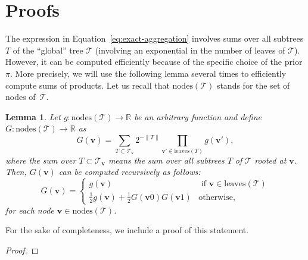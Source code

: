 \documentclass{article}
\newcommand{\R}{\mathbb R}
\newcommand{\node}{\mathbf{v}} %
\newcommand{\nodes}{\mathrm{nodes}} %
\newcommand{\leaves}{\mathrm{leaves}} %
\newcommand{\tree}{\mathcal{T}} %
\newtheorem{lemma}{Lemma}
\begin{document}



\section{Proofs}
\label{sec:proofs}

The expression in Equation~\eqref{eq:exact-aggregation} involves sums over all subtrees $T$ of the ``global'' tree $\tree$ (involving an exponential in the number of leaves of $\tree$).
However, it can be computed efficiently because of the specific choice of the prior $\pi$.
More precisely, we will use the following lemma \cite[Lemma~1]{helmbold1997pruning} several times to efficiently compute sums of products.
Let us recall that $\nodes(\tree)$ stands for the set of nodes of~$\tree$.
\begin{lemma}
  \label{lem:ctw-sum-prod}
  Let $g: \nodes(\tree) \to \R$ be an arbitrary function and define $G: \nodes(\tree) \to \R$ as
  \begin{equation}
  \label{eq:ctw-sum-prod-def}
  G (\node) = \sum_{T \subset \tree_\node} 2^{- \| T \|} 
  \prod_{\node' \in \leaves(T)} g(\node'),
  \end{equation}
  where the sum over $T \subset \tree_\node$ means the sum over all subtrees $T$ of $\tree$ rooted at $\node$. 
  Then\textup, $G (\node)$ can be computed recursively as follows\textup:
  \begin{equation*}
    G(\node) = 
    \begin{cases}
      g(\node) & \text{ if } \node \in \leaves(\tree) \\
      \frac{1}{2} g(\node) + \frac{1}{2} G(\node 0) G(\node 1) & \mathrm{ otherwise,}
    \end{cases}
  \end{equation*}
  for each node $\node \in \nodes(\tree)$.
\end{lemma}
For the sake of completeness, we include a proof of this statement.
\begin{proof}
\end{proof}
\end{document}
